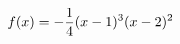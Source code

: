 \documentclass[preview]{standalone}
\begin{document}
\begin{align*}
\special{dvisvgm:raw <g id='unique000'>}f(x)=-\frac14(x-1)^3(x-2)^2\special{dvisvgm:raw </g>}
\end{align*}
\end{document}
